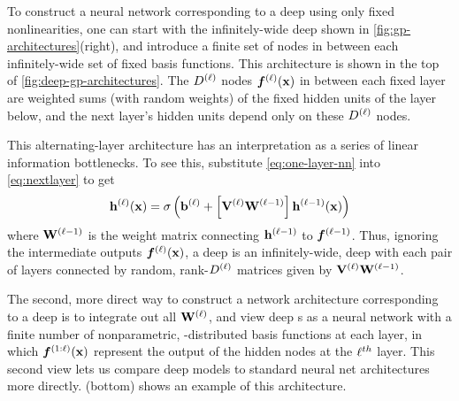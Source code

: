 To construct a neural network corresponding to a deep \gp{} using only fixed nonlinearities, 
one can start with the infinitely-wide deep \MLP{} shown in \cref{fig:gp-architectures}(right), and introduce a finite set of nodes in between each infinitely-wide set of fixed basis functions.
This architecture is shown in the top of \cref{fig:deep-gp-architectures}.
The $D^{(\ell)}$ nodes $\boldsymbol{f}^{(\ell)}({\bf{x}})$ in between each fixed layer are weighted sums (with random weights) of the fixed hidden units of the layer below, and the next layer's hidden units depend only on these $D^{(\ell)}$ nodes.

This alternating-layer architecture has an interpretation as a series of linear information bottlenecks.
To see this, substitute \cref{eq:one-layer-nn} into \cref{eq:nextlayer} to get
%
\begin{align}
{\bf{h}}^{(\ell)}({\bf{x}}) = \sigma \left( {\bf{b}}^{(\ell)} + \left[ \mathbf{V}^{(\ell)} \mathbf{W}^{(\ell-1)} \right] {\bf{h}}^{(\ell-1)}({\bf{x}}) \right)
\end{align}
%
where $\mathbf{W}^{(\ell-1)}$ is the weight matrix connecting ${\bf{h}}^{(\ell-1)}$ to $\boldsymbol{f}^{(\ell - 1)}$.
Thus, ignoring the intermediate outputs $\boldsymbol{f}^{(\ell)}({\bf{x}})$, a deep \gp{} is an infinitely-wide, deep \MLP{} with each pair of layers connected by random, rank-$D^{(\ell)}$ matrices given by $\mathbf{V}^{(\ell)} \mathbf{W}^{(\ell-1)}$.

The second, more direct way to construct a network architecture corresponding to a deep \gp{} is to integrate out all $\mathbf{W}^{(\ell)}$, and view deep \gp{}s as a neural network with a finite number of nonparametric, \gp{}-distributed basis functions at each layer, in which $\boldsymbol{f}^{(1:\ell)}({\bf{x}})$ represent the output of the hidden nodes at the $\ell^{th}$ layer.
This second view lets us compare deep \gp{} models to standard neural net architectures more directly.
(bottom) shows an example of this architecture.




